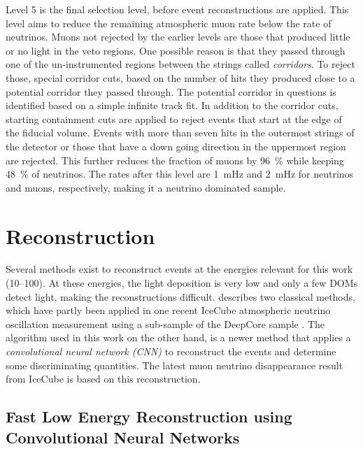 Level 5 is the final selection level, before event reconstructions are applied. This level aims to reduce the remaining atmospheric muon rate below the rate of neutrinos. Muons not rejected by the earlier levels are those that produced little or no light in the veto regions. One possible reason is that they passed through one of the un-instrumented regions between the strings  called \textit{corridors}. To reject those, special corridor cuts, based on the number of hits they produced close to a potential corridor they passed through. The potential corridor in questions is identified based on a simple infinite track fit. In addition to the corridor cuts, starting containment cuts are applied to reject events that start at the edge of the fiducial volume. Events with more than seven hits in the outermost strings of the detector or those that have a down going direction in the uppermost region are rejected. This further reduces the fraction of muons by \SI{96}{\percent} while keeping \SI{48}{\percent} of neutrinos. The rates after this level are \SI{1}{\milli\hertz} and \SI{2}{\milli\hertz} for neutrinos and muons, respectively, making it a neutrino dominated sample.



\section{Reconstruction} 

Several methods exist to reconstruct events at the energies relevant for this work (\SIrange{10}{100}{\gev}). At these energies, the light deposition is very low and only a few DOMs detect light, making the reconstructions difficult.  describes two classical methods, which have partly been applied in one recent IceCube atmospheric neutrino oscillation measurement using a
sub-sample of the DeepCore sample . The algorithm used in this work on the other hand, is a newer method that applies a \textit{convolutional neural network (CNN)} to reconstruct the events and determine some discriminating quantities. The latest muon neutrino disappearance result from IceCube  is based on this reconstruction.


\subsection{Fast Low Energy Reconstruction using Convolutional Neural Networks} 

